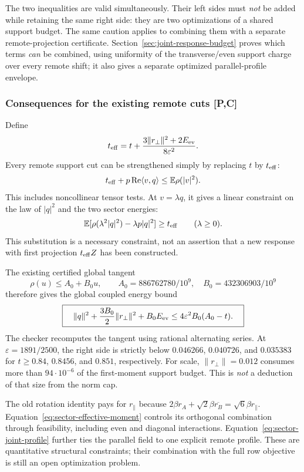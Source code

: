 The two inequalities are valid simultaneously. Their left sides must
\emph{not} be added while retaining the same right side: they are two
optimizations of a shared support budget. The same caution applies to
combining them with a separate remote-projection certificate. Section~\ref{sec:joint-response-budget} proves which terms \emph{can} be combined, using uniformity of the
transverse/even support charge over every remote shift; it also gives a separate optimized parallel-profile envelope.

\subsubsection{Consequences for the existing remote cuts [P,C]}
Define
\[
 t_{\rm eff}=t+\frac{3\|r_\perp\|^2+2E_{\rm ev}}{8\varepsilon^2}.
\]
Every remote support cut can be strengthened simply by replacing $t$ by
$t_{\rm eff}$:
\begin{equation}\label{eq:sector-all-tests}
 t_{\rm eff}+p\operatorname{Re}\langle v,q\rangle
       \le\mathbb E\rho(|v|^2).
\end{equation}
This includes noncollinear tensor tests. At $v=\lambda q$, it gives a
linear constraint on the law of $|q|^2$ and the two sector energies:
\[
 \mathbb E[\rho(\lambda^2|q|^2)-\lambda p|q|^2]
 \ge t_{\rm eff}\qquad(\lambda\ge0).
\]
This substitution is a necessary constraint, not an assertion that a new
response with first projection $t_{\rm eff}Z$ has been constructed.

The existing certified global tangent
\[
 \rho(u)\le A_0+B_0u,\qquad
 A_0=886762780/10^9,\quad B_0=432306903/10^9
\]
therefore gives the global coupled energy bound
\begin{equation}\label{eq:sector-energy-cut}
 \boxed{\quad
 \|q\|^2+\frac{3B_0}{2}\|r_\perp\|^2+B_0E_{\rm ev}
 \le4\varepsilon^2B_0(A_0-t).\quad}
\end{equation}
The checker recomputes the tangent using rational alternating series.
At $\varepsilon=1891/2500$, the right side is strictly below
$0.046266$, $0.040726$, and $0.035383$ for
$t\ge0.84$, $0.8456$, and $0.851$, respectively.
For scale, $\|r_\perp\|=0.012$ consumes more than $94\cdot10^{-6}$
of the first-moment support budget. This is \emph{not} a deduction of
that size from the norm cap.

The old rotation identity pays for $r_\parallel$ because
$2\beta r_A+\sqrt2\beta\overline{r_B}=\sqrt6\beta r_\parallel$.
Equation~\eqref{eq:sector-effective-moment} controls its orthogonal
combination through feasibility, including even and diagonal interactions.
Equation~\eqref{eq:sector-joint-profile} further ties the parallel field
to one explicit remote profile. These are quantitative structural
constraints; their combination with the full row objective is still an
open optimization problem.

